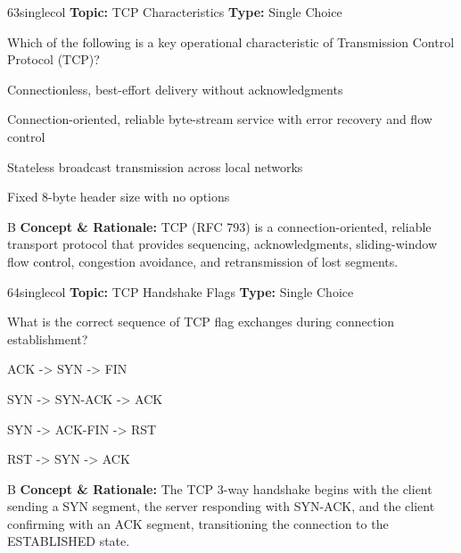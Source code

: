 \begin{qcard}{63}{singlecol}
\textcolor{darkslate!75}{\small\textbf{Topic:} TCP Characteristics \hfill \textbf{Type:} Single Choice}\vspace{0.4em}\par
Which of the following is a key operational characteristic of Transmission Control Protocol (TCP)?
\begin{qoptions}
\item Connectionless, best-effort delivery without acknowledgments
\item Connection-oriented, reliable byte-stream service with error recovery and flow control
\item Stateless broadcast transmission across local networks
\item Fixed 8-byte header size with no options
\end{qoptions}
\end{qcard}
\nopagebreak
\begin{explainbox}{B}
\textbf{Concept \& Rationale:} TCP (RFC 793) is a connection-oriented, reliable transport protocol that provides sequencing, acknowledgments, sliding-window flow control, congestion avoidance, and retransmission of lost segments.
\end{explainbox}

\begin{qcard}{64}{singlecol}
\textcolor{darkslate!75}{\small\textbf{Topic:} TCP Handshake Flags \hfill \textbf{Type:} Single Choice}\vspace{0.4em}\par
What is the correct sequence of TCP flag exchanges during connection establishment?
\begin{qoptions}
\item ACK -\textgreater{} SYN -\textgreater{} FIN
\item SYN -\textgreater{} SYN-ACK -\textgreater{} ACK
\item SYN -\textgreater{} ACK-FIN -\textgreater{} RST
\item RST -\textgreater{} SYN -\textgreater{} ACK
\end{qoptions}
\end{qcard}
\nopagebreak
\begin{explainbox}{B}
\textbf{Concept \& Rationale:} The TCP 3-way handshake begins with the client sending a SYN segment, the server responding with SYN-ACK, and the client confirming with an ACK segment, transitioning the connection to the ESTABLISHED state.
\end{explainbox}

